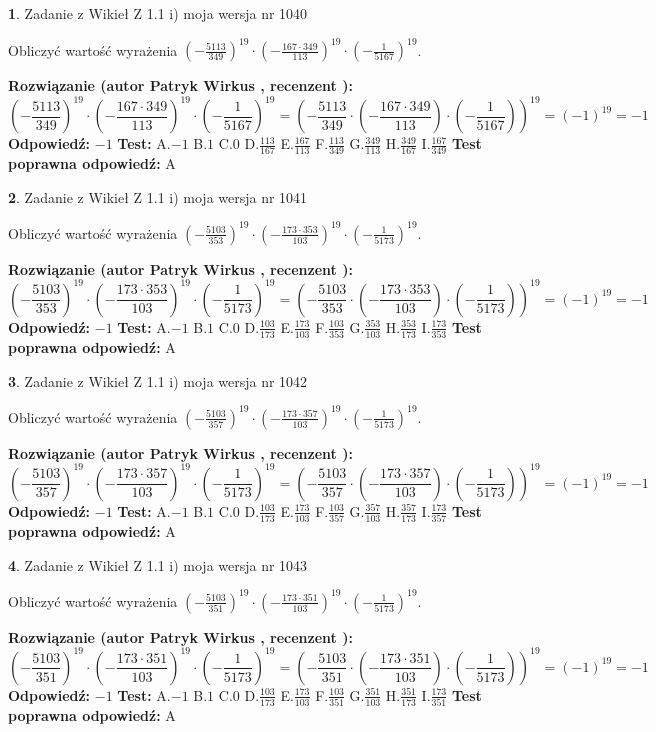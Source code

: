 \documentclass[12pt, a4paper]{article}
\theoremstyle{definition} %
\newtheorem{zad}{}
\newcommand{\zadStart}[1]{\begin{zad}#1\newline}
\newcommand{\zadStop}{\end{zad}}
\newcommand{\rozwStart}[2]{\noindent \textbf{Rozwiązanie (autor #1 , recenzent #2): }\newline}
\newcommand{\rozwStop}{\newline}
\newcommand{\odpStart}{\noindent \textbf{Odpowiedź:}\newline}
\newcommand{\odpStop}{\newline}
\newcommand{\testStart}{\noindent \textbf{Test:}\newline}
\newcommand{\testStop}{\newline}
\newcommand{\kluczStart}{\noindent \textbf{Test poprawna odpowiedź:}\newline}
\newcommand{\kluczStop}{\newline}
\begin{document}
\zadStart{Zadanie z Wikieł Z 1.1 i) moja wersja nr 1040}

Obliczyć wartość wyrażenia $(-\frac{5113}{349})^{19} \cdot (-\frac{167 \cdot 349}{113})^{19} \cdot (-\frac{1}{5167})^{19}$.
\zadStop
\rozwStart{Patryk Wirkus}{}
$$(-\frac{5113}{349})^{19} \cdot (-\frac{167 \cdot 349}{113})^{19} \cdot (-\frac{1}{5167})^{19} = (-\frac{5113}{349} \cdot (-\frac{167 \cdot 349}{113}) \cdot (-\frac{1}{5167}))^{19} = (-1)^{19} = -1$$
\rozwStop
\odpStart
$-1$
\odpStop
\testStart
A.$-1$ B.$1$ C.$0$ D.$\frac{113}{167}$ E.$\frac{167}{113}$
F.$\frac{113}{349}$ G.$\frac{349}{113}$
H.$\frac{349}{167}$
I.$\frac{167}{349}$
\testStop
\kluczStart
A
\kluczStop



\zadStart{Zadanie z Wikieł Z 1.1 i) moja wersja nr 1041}

Obliczyć wartość wyrażenia $(-\frac{5103}{353})^{19} \cdot (-\frac{173 \cdot 353}{103})^{19} \cdot (-\frac{1}{5173})^{19}$.
\zadStop
\rozwStart{Patryk Wirkus}{}
$$(-\frac{5103}{353})^{19} \cdot (-\frac{173 \cdot 353}{103})^{19} \cdot (-\frac{1}{5173})^{19} = (-\frac{5103}{353} \cdot (-\frac{173 \cdot 353}{103}) \cdot (-\frac{1}{5173}))^{19} = (-1)^{19} = -1$$
\rozwStop
\odpStart
$-1$
\odpStop
\testStart
A.$-1$ B.$1$ C.$0$ D.$\frac{103}{173}$ E.$\frac{173}{103}$
F.$\frac{103}{353}$ G.$\frac{353}{103}$
H.$\frac{353}{173}$
I.$\frac{173}{353}$
\testStop
\kluczStart
A
\kluczStop



\zadStart{Zadanie z Wikieł Z 1.1 i) moja wersja nr 1042}

Obliczyć wartość wyrażenia $(-\frac{5103}{357})^{19} \cdot (-\frac{173 \cdot 357}{103})^{19} \cdot (-\frac{1}{5173})^{19}$.
\zadStop
\rozwStart{Patryk Wirkus}{}
$$(-\frac{5103}{357})^{19} \cdot (-\frac{173 \cdot 357}{103})^{19} \cdot (-\frac{1}{5173})^{19} = (-\frac{5103}{357} \cdot (-\frac{173 \cdot 357}{103}) \cdot (-\frac{1}{5173}))^{19} = (-1)^{19} = -1$$
\rozwStop
\odpStart
$-1$
\odpStop
\testStart
A.$-1$ B.$1$ C.$0$ D.$\frac{103}{173}$ E.$\frac{173}{103}$
F.$\frac{103}{357}$ G.$\frac{357}{103}$
H.$\frac{357}{173}$
I.$\frac{173}{357}$
\testStop
\kluczStart
A
\kluczStop



\zadStart{Zadanie z Wikieł Z 1.1 i) moja wersja nr 1043}

Obliczyć wartość wyrażenia $(-\frac{5103}{351})^{19} \cdot (-\frac{173 \cdot 351}{103})^{19} \cdot (-\frac{1}{5173})^{19}$.
\zadStop
\rozwStart{Patryk Wirkus}{}
$$(-\frac{5103}{351})^{19} \cdot (-\frac{173 \cdot 351}{103})^{19} \cdot (-\frac{1}{5173})^{19} = (-\frac{5103}{351} \cdot (-\frac{173 \cdot 351}{103}) \cdot (-\frac{1}{5173}))^{19} = (-1)^{19} = -1$$
\rozwStop
\odpStart
$-1$
\odpStop
\testStart
A.$-1$ B.$1$ C.$0$ D.$\frac{103}{173}$ E.$\frac{173}{103}$
F.$\frac{103}{351}$ G.$\frac{351}{103}$
H.$\frac{351}{173}$
I.$\frac{173}{351}$
\testStop
\kluczStart
A
\kluczStop
\end{document}
